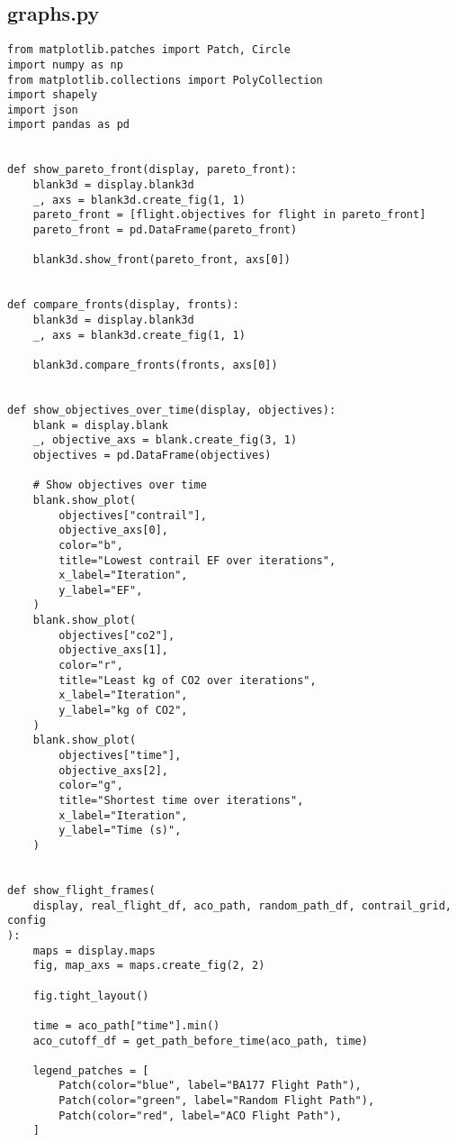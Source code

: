 \subsection{graphs.py}
\begin{verbatim}
from matplotlib.patches import Patch, Circle
import numpy as np
from matplotlib.collections import PolyCollection
import shapely
import json
import pandas as pd


def show_pareto_front(display, pareto_front):
    blank3d = display.blank3d
    _, axs = blank3d.create_fig(1, 1)
    pareto_front = [flight.objectives for flight in pareto_front]
    pareto_front = pd.DataFrame(pareto_front)

    blank3d.show_front(pareto_front, axs[0])


def compare_fronts(display, fronts):
    blank3d = display.blank3d
    _, axs = blank3d.create_fig(1, 1)

    blank3d.compare_fronts(fronts, axs[0])


def show_objectives_over_time(display, objectives):
    blank = display.blank
    _, objective_axs = blank.create_fig(3, 1)
    objectives = pd.DataFrame(objectives)

    # Show objectives over time
    blank.show_plot(
        objectives["contrail"],
        objective_axs[0],
        color="b",
        title="Lowest contrail EF over iterations",
        x_label="Iteration",
        y_label="EF",
    )
    blank.show_plot(
        objectives["co2"],
        objective_axs[1],
        color="r",
        title="Least kg of CO2 over iterations",
        x_label="Iteration",
        y_label="kg of CO2",
    )
    blank.show_plot(
        objectives["time"],
        objective_axs[2],
        color="g",
        title="Shortest time over iterations",
        x_label="Iteration",
        y_label="Time (s)",
    )


def show_flight_frames(
    display, real_flight_df, aco_path, random_path_df, contrail_grid, config
):
    maps = display.maps
    fig, map_axs = maps.create_fig(2, 2)

    fig.tight_layout()

    time = aco_path["time"].min()
    aco_cutoff_df = get_path_before_time(aco_path, time)

    legend_patches = [
        Patch(color="blue", label="BA177 Flight Path"),
        Patch(color="green", label="Random Flight Path"),
        Patch(color="red", label="ACO Flight Path"),
    ]


\end{verbatim}
